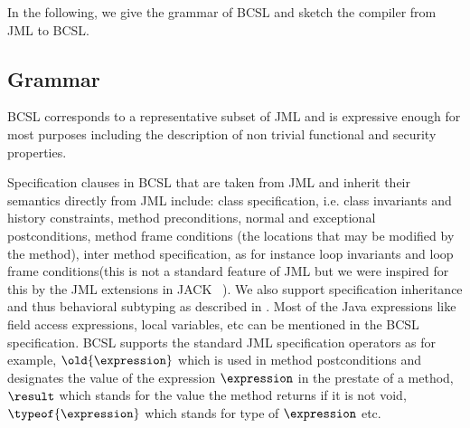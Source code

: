 In the following, we give the grammar of BCSL and sketch the compiler from JML to BCSL. 

\subsection{Grammar} \label{grammar}


BCSL corresponds to a representative subset of JML and is expressive enough for most purposes including the description of non trivial functional and security properties.

 Specification clauses in BCSL that are taken from JML and inherit their semantics directly from JML include:
class specification, i.e. class invariants and history constraints,   %
  method preconditions, normal and exceptional postconditions, method frame conditions (the locations that may be modified by the method), inter method specification, as for instance loop invariants and loop frame conditions(this is not a standard feature of JML but we were inspired for this by the JML extensions in JACK ~\cite{BRL-JACK}). 
We also support specification inheritance and thus behavioral subtyping as described in \cite{Dhara-Leavens95b}. Most of the Java expressions like field access expressions, local variables, etc can be mentioned in the BCSL specification.
BCSL supports the standard JML specification operators as for example, $\old{\expression}$ which is used in method postconditions and
 designates the value of the expression $\expression$ in the prestate of a method, $ \result$ which stands for the value the method
returns if it is not void,  $\typeof{\expression}$ which stands for type of $\expression$ etc.  





